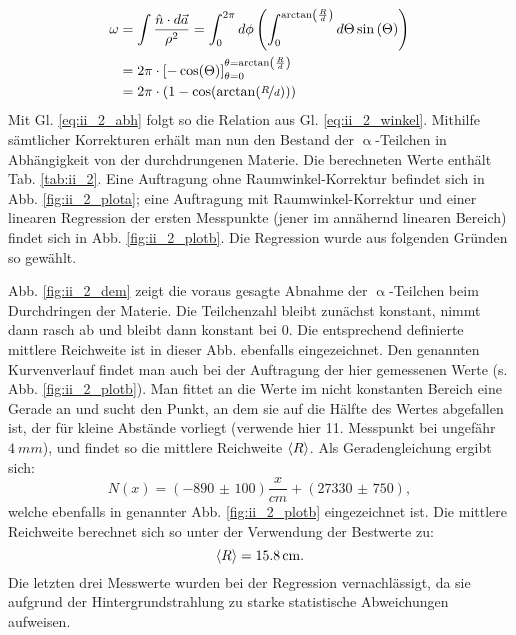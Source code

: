 \begin{align}
\omega &= \int \frac{\hat{n}\cdot d\vec{a}}{\rho^2} = \int_0^{2 \pi} d\phi \left( \int_0^{\arctan\left(\frac{R}{d}\right)} d\Theta \sin\left(\Theta\right) \right)\nonumber\\
&= 2\pi \cdot \left[ -\cos(\Theta) \right]_{\theta=0}^{\theta=\arctan\left(\frac{R}{d}\right)}\nonumber\\
&= 2\pi \cdot (1-\cos(\arctan(\nicefrac{R}{d})))
\end{align}
Mit Gl. \eqref{eq:ii_2_abh} folgt so die Relation aus Gl. \eqref{eq:ii_2_winkel}. Mithilfe sämtlicher Korrekturen erhält man nun den Bestand der $\upalpha$-Teilchen in Abhängigkeit von der durchdrungenen Materie. Die berechneten Werte enthält Tab. \ref{tab:ii_2}. Eine Auftragung ohne Raumwinkel-Korrektur befindet sich in Abb. \ref{fig:ii_2_plota}; eine Auftragung mit Raumwinkel-Korrektur und einer linearen Regression der ersten Messpunkte (jener im annähernd linearen Bereich) findet sich in Abb. \ref{fig:ii_2_plotb}. Die Regression wurde aus folgenden Gründen so gewählt.


Abb. \ref{fig:ii_2_dem} zeigt die voraus gesagte Abnahme der $\upalpha$-Teilchen beim Durchdringen der Materie. Die Teilchenzahl bleibt zunächst konstant, nimmt dann rasch ab und bleibt dann konstant bei 0. Die entsprechend definierte mittlere Reichweite ist in dieser Abb. ebenfalls  eingezeichnet. Den genannten Kurvenverlauf findet man auch bei der Auftragung der hier gemessenen Werte (s. Abb. \ref{fig:ii_2_plotb}). Man fittet an die Werte im nicht konstanten Bereich eine Gerade an und sucht den Punkt, an dem sie auf die Hälfte des Wertes abgefallen ist, der für kleine Abstände vorliegt (verwende hier 11. Messpunkt bei ungefähr $\SI{4}{mm}$), und findet so die mittlere Reichweite $\left\langle R \right\rangle$. Als Geradengleichung ergibt sich:
\begin{equation}
N(x) = (\num{-890(100)})\frac{x}{\si{cm}} + (\num{27330(750)}),
\end{equation}
welche ebenfalls in genannter Abb. \ref{fig:ii_2_plotb} eingezeichnet ist. Die mittlere Reichweite berechnet sich so unter der Verwendung der Bestwerte zu:
\begin{equation}
\left\langle R \right\rangle = \SI{15,8}{cm}.
\end{equation}
Die letzten drei Messwerte wurden bei der Regression vernachlässigt, da sie aufgrund der Hintergrundstrahlung zu starke statistische Abweichungen aufweisen.

